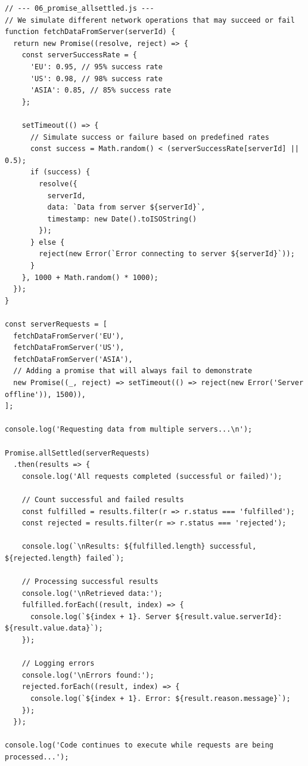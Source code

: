 \documentclass[12pt,letterpaper]{article}
\newenvironment{macterminal}{%
    \begin{mdframed}[
        linecolor=terminalFrame,
        backgroundcolor=terminalBg,
        roundcorner=5pt,
        skipabove=5pt,
        skipbelow=5pt,
        linewidth=1pt,
        innertopmargin=5pt,
        frametitle={%
            \tikz[baseline=(current bounding box.east), outer sep=0pt]{
                \fill[red!80!black] (0,0) circle (5pt);
                \fill[yellow!80!black] (0.7,0) circle (5pt);
                \fill[green!70!black] (1.4,0) circle (5pt);
            }
        },
        frametitlealignment=\raggedright,
        frametitleaboveskip=8pt,
        frametitlebelowskip=0pt,
    ]
}{%
    \end{mdframed}%
}
\begin{document}
\begin{macterminal}
\begin{lstlisting}
// --- 06_promise_allsettled.js ---
// We simulate different network operations that may succeed or fail
function fetchDataFromServer(serverId) {
  return new Promise((resolve, reject) => {
    const serverSuccessRate = {
      'EU': 0.95, // 95% success rate
      'US': 0.98, // 98% success rate
      'ASIA': 0.85, // 85% success rate
    };
    
    setTimeout(() => {
      // Simulate success or failure based on predefined rates
      const success = Math.random() < (serverSuccessRate[serverId] || 0.5);
      if (success) {
        resolve({
          serverId,
          data: `Data from server ${serverId}`,
          timestamp: new Date().toISOString()
        });
      } else {
        reject(new Error(`Error connecting to server ${serverId}`));
      }
    }, 1000 + Math.random() * 1000);
  });
}

const serverRequests = [
  fetchDataFromServer('EU'),
  fetchDataFromServer('US'),
  fetchDataFromServer('ASIA'),
  // Adding a promise that will always fail to demonstrate
  new Promise((_, reject) => setTimeout(() => reject(new Error('Server offline')), 1500)),
];

console.log('Requesting data from multiple servers...\n');

Promise.allSettled(serverRequests)
  .then(results => {
    console.log('All requests completed (successful or failed)');
    
    // Count successful and failed results
    const fulfilled = results.filter(r => r.status === 'fulfilled');
    const rejected = results.filter(r => r.status === 'rejected');
    
    console.log(`\nResults: ${fulfilled.length} successful, ${rejected.length} failed`);
    
    // Processing successful results
    console.log('\nRetrieved data:');
    fulfilled.forEach((result, index) => {
      console.log(`${index + 1}. Server ${result.value.serverId}: ${result.value.data}`);
    });
    
    // Logging errors
    console.log('\nErrors found:');
    rejected.forEach((result, index) => {
      console.log(`${index + 1}. Error: ${result.reason.message}`);
    });
  });

console.log('Code continues to execute while requests are being processed...');
\end{lstlisting}
\end{macterminal}
\end{document}
